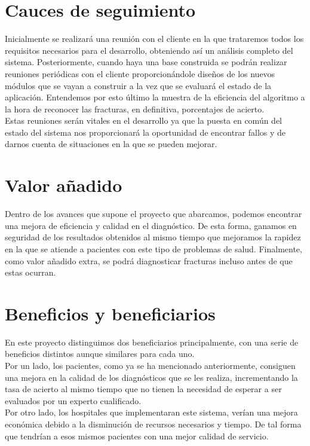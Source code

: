 \section{Cauces de seguimiento}

Inicialmente se realizará una reunión con el cliente en la que trataremos todos los requisitos necesarios para el desarrollo, obteniendo así un análisis completo del sistema. Posteriormente, cuando haya una base construida se podrán realizar reuniones periódicas con el cliente proporcionándole diseños de los nuevos módulos que se vayan a construir a la vez que se evaluará el estado de la aplicación. Entendemos por esto último la muestra de la eficiencia del algoritmo a la hora de reconocer las fracturas, en definitiva, porcentajes de acierto.\\

Estas reuniones serán vitales en el desarrollo ya que la puesta en común del estado del sistema nos proporcionará la oportunidad de encontrar fallos y de darnos cuenta de situaciones en la que se pueden mejorar.

\section{Valor añadido}

Dentro de los avances que supone el proyecto que abarcamos, podemos encontrar una mejora de eficiencia y calidad en el diagnóstico. De esta forma, ganamos en seguridad de los resultados obtenidos al mismo tiempo que mejoramos la rapidez en la que se atiende a pacientes con este tipo de problemas de salud. Finalmente, como valor añadido extra, se podrá diagnosticar fracturas incluso antes de que estas ocurran.

\section{Beneficios y beneficiarios}

En este proyecto distinguimos dos beneficiarios principalmente, con una serie de beneficios distintos aunque similares para cada uno. \\

Por un lado, los pacientes, como ya se ha mencionado anteriormente, consiguen una mejora en la calidad de los diagnósticos que se les realiza, incrementando la tasa de acierto al mismo tiempo que no tienen la necesidad de esperar a ser evaluados por un experto cualificado. \\

Por otro lado, los hospitales que implementaran este sistema, verían una mejora económica debido a la disminución de recursos necesarios y tiempo. De tal forma que tendrían a esos mismos pacientes con una mejor calidad de servicio.






       
